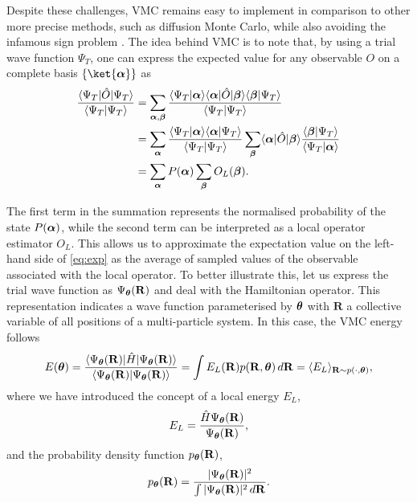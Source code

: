 Despite these challenges, VMC remains easy to implement in comparison to other more precise methods, such as diffusion Monte Carlo, while also avoiding the infamous sign problem \cite{Pan_2024}. The idea behind VMC is to note that, by using a trial wave function $\Psi_T$, one can express the expected value for any observable $O$ on a complete basis $\{\ket{\mvec{\alpha}}\}$ as 
\begin{align}
    \frac{\langle\Psi_T |\hat{O}|\Psi_T\rangle}{\langle\Psi_T |\Psi_T\rangle} &= \sum_{\boldsymbol{\alpha}, \boldsymbol{\beta}}\frac{\langle\Psi_T |\boldsymbol{\alpha}\rangle\langle \boldsymbol{\alpha} | \hat{O}|\boldsymbol{\beta}\rangle \langle \boldsymbol{\beta} |\Psi_T\rangle}{\langle\Psi_T |\Psi_T\rangle}\\
    &=\sum_{\boldsymbol{\alpha}} \frac{\langle\Psi_T |\boldsymbol{\alpha}\rangle\langle \boldsymbol{\alpha} |\Psi_T\rangle}{\langle\Psi_T |\Psi_T\rangle}\sum_{\boldsymbol{\beta}}  \langle \boldsymbol{\alpha} | \hat{O}|\boldsymbol{\beta}\rangle  \frac{ \langle \boldsymbol{\beta} |\Psi_T\rangle}{\langle\Psi_T |\boldsymbol{\alpha} \rangle}\\
    &=\sum_{\boldsymbol{\alpha}}P(\boldsymbol{\alpha})\sum_{\boldsymbol{\beta}}O_{L}(\boldsymbol{\beta}).
    \label{eq:exp}
\end{align}

The first term in the summation represents the normalised probability of the state $P(\boldsymbol{\alpha})$, while the second term can be interpreted as a local operator estimator $O_L$. This allows us to approximate the expectation value on the left-hand side of \eqref{eq:exp} as the average of sampled values of the observable associated with the local operator. To better illustrate this, let us express the trial wave function as $\Psi_{\boldsymbol{\theta}}(\mathbf{R})$ and deal with the Hamiltonian operator. This representation indicates a wave function parameterised by $\boldsymbol{\theta}$ with $\mathbf{R}$ a collective variable of all positions of a multi-particle system. In this case, the VMC energy follows
\begin{equation}
    E(\boldsymbol{\theta}) = \frac{\langle \Psi_{\boldsymbol{\theta}}(\mathbf{R}) | \hat{H} | \Psi_{\boldsymbol{\theta}}(\mathbf{R}) \rangle}{\langle \Psi_{\boldsymbol{\theta}}(\mathbf{R}) | \Psi_{\boldsymbol{\theta}}(\mathbf{R}) \rangle} =  \int E_L(\mathbf{R}) p(\mathbf{R}, \boldsymbol{\theta}) \, d\mathbf{R} = \langle E_L \rangle_{\mathbf{R} \sim p(\cdot, \boldsymbol{\theta})},
    \label{eq:vmc_energy_integral}
\end{equation}
where we have introduced the concept of a local energy $E_L$,
\begin{equation}
    E_L = \frac{\hat{H} \Psi_{\boldsymbol{\theta}}(\mathbf{R})}{\Psi_{\boldsymbol{\theta}}(\mathbf{R})},
    \label{eq:local_energy}
\end{equation}
and the probability density function $p_{\boldsymbol{\theta}}(\mathbf{R})$,
\begin{equation}
p_{\boldsymbol{\theta}}(\mathbf{R}) = \frac{|\Psi_{\boldsymbol{\theta}}(\mathbf{R})|^2}{\int |\Psi_{\boldsymbol{\theta}}(\mathbf{R})|^2 \, d\mathbf{R}}.
\label{eq:probability_density}
\end{equation}



